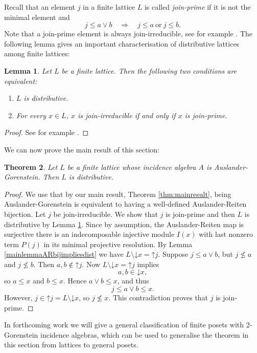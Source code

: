 \documentclass[a4paper]{amsart}
\newtheorem{theorem}{Theorem}[section]
\newtheorem{lemma}[theorem]{Lemma}
\theoremstyle{definition}
\theoremstyle{remark}
\numberwithin{equation}{section}
\newcommand{\upset}[1]{\mathord{\uparrow}\!#1}
\newcommand{\downset}[1]{\mathord{\downarrow}\!#1}
\begin{document}
Recall that an element $j$ in a finite lattice $L$ is called \emph{join-prime} if it is not the minimal element and 
\[
 j\leq a\vee b\quad\Longrightarrow\quad
 j\leq a\ \text{or}\ j\leq b.
\] Note that a join-prime element is always join-irreducible, see for example \cite[Chapter 9.3]{Gar}.
The following lemma gives an important characterisation of distributive lattices among finite lattices:
\begin{lemma} \label{distributive lattice characterisationlemma}
Let $L$ be a finite lattice.
Then the following two conditions are equivalent:
\begin{enumerate}
    \item $L$ is distributive.
    \item For every $x \in L$, $x$ is join-irreducible if and only if $x$ is join-prime.
\end{enumerate}
\end{lemma}
\begin{proof}
See for example \cite[Theorem 5.1]{CLM}.
\end{proof}
We can now prove the main result of this section:
\begin{theorem}
Let $L$ be a finite lattice whose incidence algebra $A$ is Auslander-Gorenstein. Then $L$ is distributive.
\end{theorem}
\begin{proof}
We use that by our main result, Theorem \ref{thm:mainresult}, being Auslander-Gorenstein is equivalent to having a well-defined Auslander-Reiten bijection.
Let $j$ be join-irreducible. We show that $j$ is join-prime and then $L$ is distributive by Lemma \ref{distributive lattice characterisationlemma}. Since by assumption, the Auslander-Reiten map is surjective there is an indecomposable injective module $I(x)$ with last nonzero term $P(j)$ in its minimal projective resolution. By Lemma \ref{mainlemmaARbijimpliesdist} we have $L \setminus \downset{x}=\upset{j}$. 
Suppose \(j\leq a\vee b\), but \(j\nleq a\) and \(j\nleq b\).  Then
\(a,b\notin\upset{j}\). Now $L \setminus \downset{x}=\upset{j}$ implies
\[
 a,b\in\downset{x},
\]
so \(a\leq x\) and \(b\leq x\).  Hence \(a\vee b\leq x\), and thus
\[
 j\leq a\vee b\leq x.
\]
However, \(j\in\upset{j}=L\setminus\downset{x}\), so \(j\nleq x\).
This contradiction proves that \(j\) is join-prime.
\end{proof}
In forthcoming work \cite{IKKM} we will give a general classification of finite posets with 2-Gorenstein incidence algebras, which can be used to generalise the theorem in this section from lattices to general posets. 
\end{document}
